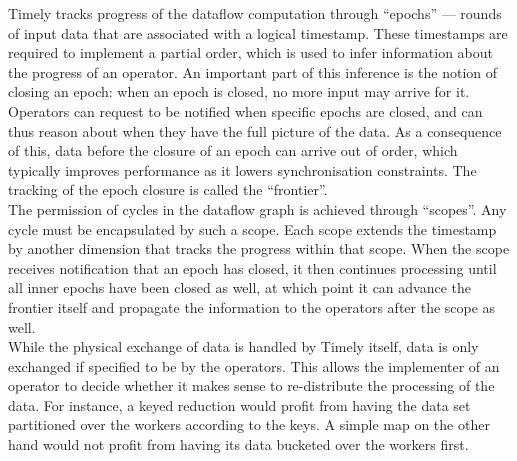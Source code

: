 Timely tracks progress of the dataflow computation through ``epochs'' --- rounds of input data that are associated with a logical timestamp. These timestamps are required to implement a partial order, which is used to infer information about the progress of an operator. An important part of this inference is the notion of closing an epoch: when an epoch is closed, no more input may arrive for it. Operators can request to be notified when specific epochs are closed, and can thus reason about when they have the full picture of the data. As a consequence of this, data before the closure of an epoch can arrive out of order, which typically improves performance as it lowers synchronisation constraints. The tracking of the epoch closure is called the ``frontier''. \\

The permission of cycles in the dataflow graph is achieved through ``scopes''. Any cycle must be encapsulated by such a scope. Each scope extends the timestamp by another dimension that tracks the progress within that scope. When the scope receives notification that an epoch has closed, it then continues processing until all inner epochs have been closed as well, at which point it can advance the frontier itself and propagate the information to the operators after the scope as well. \\

While the physical exchange of data is handled by Timely itself, data is only exchanged if specified to be by the operators. This allows the implementer of an operator to decide whether it makes sense to re-distribute the processing of the data. For instance, a keyed reduction would profit from having the data set partitioned over the workers according to the keys. A simple map on the other hand would not profit from having its data bucketed over the workers first.

